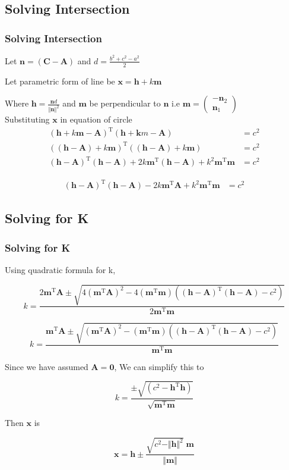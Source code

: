 \documentclass{beamer}
\theoremstyle{remark}
\newcommand{\myvec}[1]{\ensuremath{\begin{pmatrix}#1\end{pmatrix}}}
\let\vec\mathbf
\numberwithin{equation}{section}
\begin{document}
\subsection{Solving Intersection}
\begin{frame}
\frametitle{Solving Intersection}
	Let $\vec{n} = (\vec{C} - \vec{A})$ and $d = \frac{b^2 + c^2 - a^2}{2}$

	Let parametric form of line be $\vec{x} = \vec{h} + k\vec{m}$

	Where $\vec{h} = \frac{\vec{n}d}{\Vert \vec{n} \Vert^2}$ and $\vec{m}$ be perpendicular to $\vec{n}$ i.e $\vec{m} = \myvec{-\vec{n}_2 \\ \vec{n}_1}$
	\\

	Substituting $\vec{x}$ in equation of circle
	\begin{align*}
		(\vec{h} + k\vec{m} - \vec{A})^\text{T} (\vec{h} + \vec{k}m - \vec{A}) &= c^2\\
		((\vec{h} - \vec{A}) + k\vec{m})^\text{T} ((\vec{h} - \vec{A}) + k\vec{m}) &= c^2\\
		(\vec{h} - \vec{A})^\text{T}(\vec{h} - \vec{A}) + 2k\vec{m}^\text{T}(\vec{h} - \vec{A}) + k^2\vec{m}^\text{T}\vec{m} &= c^2
	\end{align*}

	\text{Since $\vec{m}^T\vec{h} = 0$}
	\begin{align*}
		(\vec{h} - \vec{A})^\text{T}(\vec{h} - \vec{A}) - 2k\vec{m}^\text{T}\vec{A} + k^2\vec{m}^\text{T}\vec{m} &= c^2	
	\end{align*}
\end{frame}

\subsection{Solving for K}
\begin{frame}
\frametitle{Solving for K}

	Using quadratic formula for k,

	$$k = \frac{2\vec{m}^\text{T}\vec{A} \pm \sqrt{4(\vec{m}^\text{T}\vec{A})^2 - 4 (\vec{m}^\text{T}\vec{m})((\vec{h} - \vec{A})^\text{T}(\vec{h} - \vec{A}) - c^2)}}{2\vec{m}^\text{T}\vec{m}}$$

	$$k = \frac{\vec{m}^\text{T}\vec{A} \pm \sqrt{(\vec{m}^\text{T}\vec{A})^2 - (\vec{m}^\text{T}\vec{m})((\vec{h} - \vec{A})^\text{T}(\vec{h} - \vec{A}) - c^2)}}{\vec{m}^\text{T}\vec{m}}$$

	Since we have assumed $\vec{A} = \vec{0}$, We can simplify this to

	$$k = \frac{\pm \sqrt{(c^2 - \vec{h}^\text{T}\vec{h})}}{\sqrt{\vec{m}^\text{T}\vec{m}}}$$

	Then $\vec{x}$ is

	$$\vec{x} = \vec{h} \pm \frac{\sqrt{c^2 - \Vert \vec{h} \Vert^2} \; \vec{m}}{\Vert \vec{m} \Vert}$$
	
\end{frame}
\end{document}
